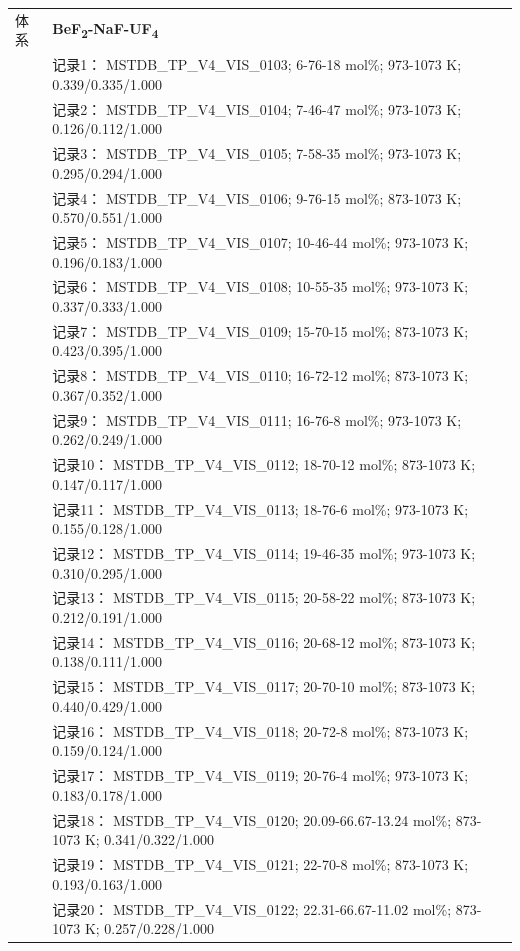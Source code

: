 \documentclass[12pt]{article}
\begin{document}
{\begin{longtable}[]{@{}
  >{\raggedright\arraybackslash}p{}
  >{\raggedright\arraybackslash}p{}@{}}
\midrule
体系 & \textbf{BeF\textsubscript{2}-NaF-UF\textsubscript{4}} \\
 & 记录1： MSTDB\_TP\_V4\_VIS\_0103; 6-76-18 mol\%; 973-1073 K; 0.339/0.335/1.000 \\
 & 记录2： MSTDB\_TP\_V4\_VIS\_0104; 7-46-47 mol\%; 973-1073 K; 0.126/0.112/1.000 \\
 & 记录3： MSTDB\_TP\_V4\_VIS\_0105; 7-58-35 mol\%; 973-1073 K; 0.295/0.294/1.000 \\
 & 记录4： MSTDB\_TP\_V4\_VIS\_0106; 9-76-15 mol\%; 873-1073 K; 0.570/0.551/1.000 \\
 & 记录5： MSTDB\_TP\_V4\_VIS\_0107; 10-46-44 mol\%; 973-1073 K; 0.196/0.183/1.000 \\
 & 记录6： MSTDB\_TP\_V4\_VIS\_0108; 10-55-35 mol\%; 973-1073 K; 0.337/0.333/1.000 \\
 & 记录7： MSTDB\_TP\_V4\_VIS\_0109; 15-70-15 mol\%; 873-1073 K; 0.423/0.395/1.000 \\
 & 记录8： MSTDB\_TP\_V4\_VIS\_0110; 16-72-12 mol\%; 873-1073 K; 0.367/0.352/1.000 \\
 & 记录9： MSTDB\_TP\_V4\_VIS\_0111; 16-76-8 mol\%; 973-1073 K; 0.262/0.249/1.000 \\
 & 记录10： MSTDB\_TP\_V4\_VIS\_0112; 18-70-12 mol\%; 873-1073 K; 0.147/0.117/1.000 \\
 & 记录11： MSTDB\_TP\_V4\_VIS\_0113; 18-76-6 mol\%; 973-1073 K; 0.155/0.128/1.000 \\
 & 记录12： MSTDB\_TP\_V4\_VIS\_0114; 19-46-35 mol\%; 973-1073 K; 0.310/0.295/1.000 \\
 & 记录13： MSTDB\_TP\_V4\_VIS\_0115; 20-58-22 mol\%; 873-1073 K; 0.212/0.191/1.000 \\
 & 记录14： MSTDB\_TP\_V4\_VIS\_0116; 20-68-12 mol\%; 873-1073 K; 0.138/0.111/1.000 \\
 & 记录15： MSTDB\_TP\_V4\_VIS\_0117; 20-70-10 mol\%; 873-1073 K; 0.440/0.429/1.000 \\
 & 记录16： MSTDB\_TP\_V4\_VIS\_0118; 20-72-8 mol\%; 873-1073 K; 0.159/0.124/1.000 \\
 & 记录17： MSTDB\_TP\_V4\_VIS\_0119; 20-76-4 mol\%; 973-1073 K; 0.183/0.178/1.000 \\
 & 记录18： MSTDB\_TP\_V4\_VIS\_0120; 20.09-66.67-13.24 mol\%; 873-1073 K; 0.341/0.322/1.000 \\
 & 记录19： MSTDB\_TP\_V4\_VIS\_0121; 22-70-8 mol\%; 873-1073 K; 0.193/0.163/1.000 \\
 & 记录20： MSTDB\_TP\_V4\_VIS\_0122; 22.31-66.67-11.02 mol\%; 873-1073 K; 0.257/0.228/1.000 \\

\end{longtable}}
\end{document}
